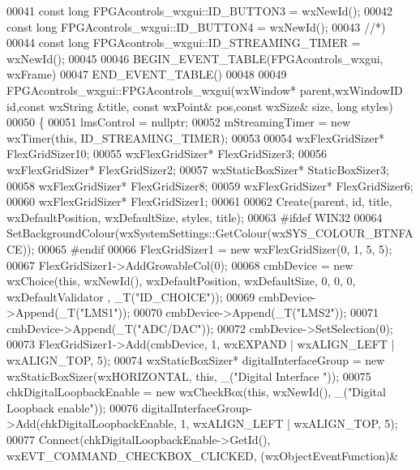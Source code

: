 \begin{DoxyCode}
00041 \textcolor{keyword}{const} \textcolor{keywordtype}{long} FPGAcontrols_wxgui::ID_BUTTON3 = wxNewId();
00042 \textcolor{keyword}{const} \textcolor{keywordtype}{long} FPGAcontrols_wxgui::ID_BUTTON4 = wxNewId();
00043 \textcolor{comment}{//*)}
00044 \textcolor{keyword}{const} \textcolor{keywordtype}{long} FPGAcontrols_wxgui::ID_STREAMING_TIMER = wxNewId();
00045 
00046 BEGIN\_EVENT\_TABLE(FPGAcontrols_wxgui, wxFrame)
00047 END\_EVENT\_TABLE()
00048 
00049 FPGAcontrols_wxgui::FPGAcontrols_wxgui(wxWindow* parent,wxWindowID \textcolor{keywordtype}{id},const wxString &title, const wxPoint&
       pos,const wxSize& size, \textcolor{keywordtype}{long} styles)
00050 \{
00051     lmsControl = \textcolor{keyword}{nullptr};
00052     mStreamingTimer = \textcolor{keyword}{new} wxTimer(\textcolor{keyword}{this}, ID\_STREAMING\_TIMER);
00053 
00054     wxFlexGridSizer* FlexGridSizer10;
00055     wxFlexGridSizer* FlexGridSizer3;
00056     wxFlexGridSizer* FlexGridSizer2;
00057     wxStaticBoxSizer* StaticBoxSizer3;
00058     wxFlexGridSizer* FlexGridSizer8;
00059     wxFlexGridSizer* FlexGridSizer6;
00060     wxFlexGridSizer* FlexGridSizer1;
00061 
00062     Create(parent, \textcolor{keywordtype}{id}, title, wxDefaultPosition, wxDefaultSize, styles, title);
00063 \textcolor{preprocessor}{#ifdef WIN32}
00064     SetBackgroundColour(wxSystemSettings::GetColour(wxSYS\_COLOUR\_BTNFACE));
00065 \textcolor{preprocessor}{#endif}
00066     FlexGridSizer1 = \textcolor{keyword}{new} wxFlexGridSizer(0, 1, 5, 5);
00067     FlexGridSizer1->AddGrowableCol(0);
00068     cmbDevice = \textcolor{keyword}{new} wxChoice(\textcolor{keyword}{this}, wxNewId(), wxDefaultPosition, wxDefaultSize, 0, 0, 0, wxDefaultValidator
      , \_T(\textcolor{stringliteral}{"ID\_CHOICE"}));
00069     cmbDevice->Append(\_T(\textcolor{stringliteral}{"LMS1"}));
00070     cmbDevice->Append(\_T(\textcolor{stringliteral}{"LMS2"}));
00071     cmbDevice->Append(\_T(\textcolor{stringliteral}{"ADC/DAC"}));
00072     cmbDevice->SetSelection(0);
00073     FlexGridSizer1->Add(cmbDevice, 1, wxEXPAND | wxALIGN\_LEFT | wxALIGN\_TOP, 5);
00074     wxStaticBoxSizer* digitalInterfaceGroup = \textcolor{keyword}{new} wxStaticBoxSizer(wxHORIZONTAL, \textcolor{keyword}{this}, \_(\textcolor{stringliteral}{"Digital Interface
      "}));
00075     chkDigitalLoopbackEnable = \textcolor{keyword}{new} wxCheckBox(\textcolor{keyword}{this}, wxNewId(), \_(\textcolor{stringliteral}{"Digital Loopback enable"}));
00076     digitalInterfaceGroup->Add(chkDigitalLoopbackEnable, 1, wxALIGN\_LEFT | wxALIGN\_TOP, 5);
00077     Connect(chkDigitalLoopbackEnable->GetId(), wxEVT\_COMMAND\_CHECKBOX\_CLICKED, (wxObjectEventFunction)&

\end{DoxyCode}
